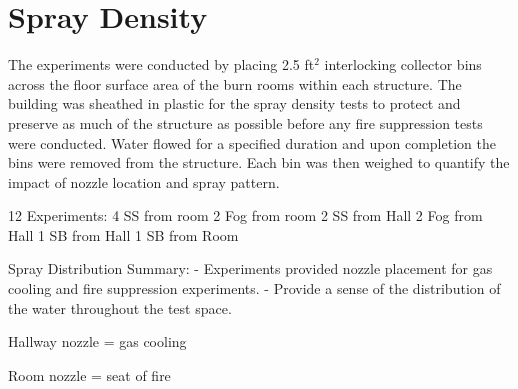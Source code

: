 \documentclass[12pt,oneside]{book}
\begin{document}

\section{Spray Density}
\label{sec:Spray_Density}

The experiments were conducted by placing 2.5 ft$^2$ interlocking collector bins across the floor surface area of the burn rooms within each structure. The building was sheathed in plastic for the spray density tests to protect and preserve as much of the structure as possible before any fire suppression tests were conducted. Water flowed for a specified duration and upon completion the bins were removed from the structure. Each bin was then weighed to quantify the impact of nozzle location and spray pattern.

12 Experiments:
4 SS from room
2 Fog from room
2 SS from Hall
2 Fog from Hall
1 SB from Hall
1 SB from Room

Spray Distribution Summary:
- Experiments provided nozzle placement for gas cooling and fire suppression experiments.
- Provide a sense of the distribution of the water throughout the test space.

Hallway nozzle = gas cooling

Room nozzle = seat of fire
\end{document}
